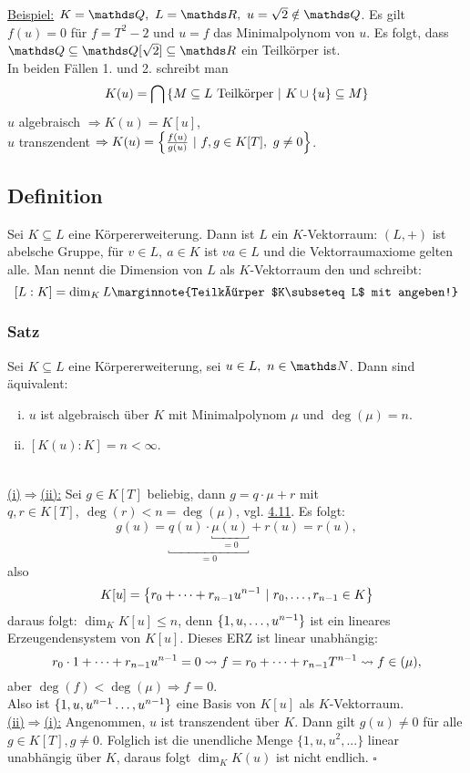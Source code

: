 \uline{Beispiel:}
$K=\Q,~L=\R,~u=\sqrt{2}\notin \Q$.
Es gilt $f(u)=0$ für $f=T^2-2$ und $u=f$ das Minimalpolynom von $u$.
Es folgt, dass $\Q\subseteq \Q[\sqrt{2}]\subseteq \R$ ein Teilkörper ist.\\

In beiden Fällen 1. und 2. schreibt man
\[
K(u)=\bigcap \left\{M\subseteq L \text{ Teilkörper}~|~K\cup\{u\}\subseteq M\right\}
\]
$u$ algebraisch $\Rightarrow K(u)=K[u]$,\\
$u$ transzendent $\Rightarrow K(u)=\left\{\frac{f(u)}{g(u)}~|~f,g\in K[T],~g\neq 0\right\}$.

\subsection{Definition }
\label{sub:def_grad_kw}
Sei $K\subseteq L$ eine Körpererweiterung.
Dann ist $L$ ein $K$-Vektorraum:
$(L,+)$ ist abelsche Gruppe, für $v\in L,~a\in K$ ist $va\in L$ und die Vektorraumaxiome gelten alle.
Man nennt die Dimension von $L$ als $K$-Vektorraum den  und schreibt:
\[
[L:K]=\dim_K L \marginnote{Teilkörper $K\subseteq L$ mit angeben!}
\]

\subsubsection*{Satz}
Sei $K\subseteq L$ eine Körpererweiterung, sei $u\in L,~n\in \N$.
Dann sind äquivalent:
\begin{enumerate}[(i)]
	\item $u$ ist algebraisch über $K$ mit Minimalpolynom $\mu$ und $\deg(\mu)=n$.
	\item $[K(u):K]=n<\infty$.
\end{enumerate}

\\
\uline{(i)$\Rightarrow$(ii):}
Sei $g\in K[T]$ beliebig, dann $g=q\cdot \mu+r$ mit $q,r\in K[T],~\deg(r)<n=\deg(\mu)$, vgl. \hyperref[sub:polynomdivision]{4.11}.
Es folgt:
\[
g(u)=\underbracket{q(u)\cdot \underbracket{\mu(u)}_{=0}}_{=0}+r(u)=r(u),
\]
also
\[
K[u]=\left\{r_0+ \dots +r_{n-1}u^{n-1}~|~r_0, \dots ,r_{n-1}\in K\right\}
\]
daraus folgt: $\dim_K K[u]\le n$, denn $\{1,u, \dots ,u^{n-1} \}$ ist ein lineares Erzeugendensystem von $K[u]$.
Dieses ERZ ist linear unabhängig:
\[
r_0\cdot 1+ \dots +r_{n-1}u^{n-1}=0 \rightsquigarrow f=r_0+ \dots +r_{n-1}T^{n-1} \rightsquigarrow f\in (\mu),
\]
aber $\deg(f)<\deg(\mu) \Rightarrow f=0$.\\
Also ist $\{1,u,u^{n-1} \dots ,u^{n-1}\}$ eine Basis von $K[u]$ als $K$-Vektorraum.\\
\uline{(ii)$\Rightarrow$(i):}
Angenommen, $u$ ist transzendent über $K$.
Dann gilt $g(u)\neq 0$ für alle $g\in K[T],g\neq 0$.
Folglich ist die unendliche Menge $\{1,u,u^2,...\}$ linear unabhängig über $K$, daraus folgt $\dim_K K(u)$ ist nicht endlich.
\hfill $\square$

